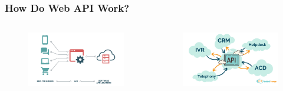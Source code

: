 \documentclass[aspectratio=169]{beamer}
\begin{document}
\begin{frame}
    \frametitle{How Do Web API Work?}
    \begin{columns}
        \begin{column}{0.5\linewidth}
            \begin{figure}
                \includegraphics[scale=0.12]{./images/api-visual.png}
            \end{figure}
        \end{column}
        \begin{column}{0.5\linewidth}
            \begin{figure}
                \includegraphics[scale=0.17]{./images/api_internal.png}
            \end{figure}
        \end{column}
    \end{columns}
    \centering
\end{frame}
\end{document}
